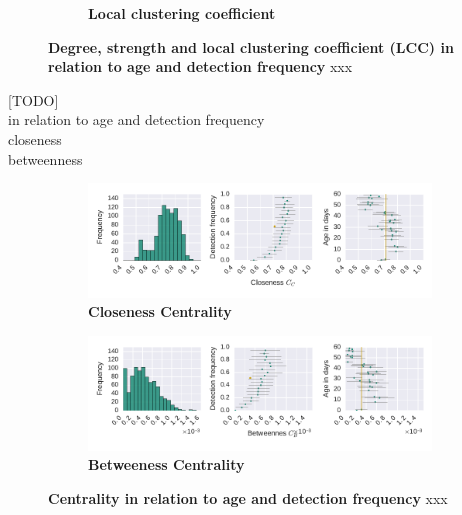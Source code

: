\begin{figure}[!htb]
\begin{subfigure}[b]{1.0\textwidth}
	\caption[Local clustering coefficient]{\textbf{Local clustering coefficient}}
	\label{fig:n3-lcc}
	\end{subfigure}
	\caption[Degree, strength and local clustering coefficient (LCC)]{\textbf{Degree, strength and local clustering coefficient (LCC) in relation to age and detection frequency} xxx}
	\label{fig:n3-degreeStrLCC}
\end{figure}


[TODO]\\
in relation to age and detection frequency\\
closeness\\
betweenness\\

\begin{figure}[!htb]
	\centering
	\begin{subfigure}[b]{1.0\textwidth}
	\centering
	\includegraphics[width=1.0\textwidth]{Figures/n3-stat-closenessAgeDetF.pdf}
	\caption[Closeness Centrality]{\textbf{Closeness Centrality}}
	\label{fig:n3-closeness}
	\end{subfigure}
	\begin{subfigure}[b]{1.0\textwidth}
	\centering
	\includegraphics[width=1.0\textwidth]{Figures/n3-stat-betweenAgeDetF.pdf}
	\caption[Betweeness Centrality]{\textbf{Betweeness Centrality}}
	\label{fig:n3-between}
	\end{subfigure}
	\caption[Centrality]{\textbf{Centrality in relation to age and detection frequency} xxx}
	\label{fig:n3-centrality}
\end{figure}
